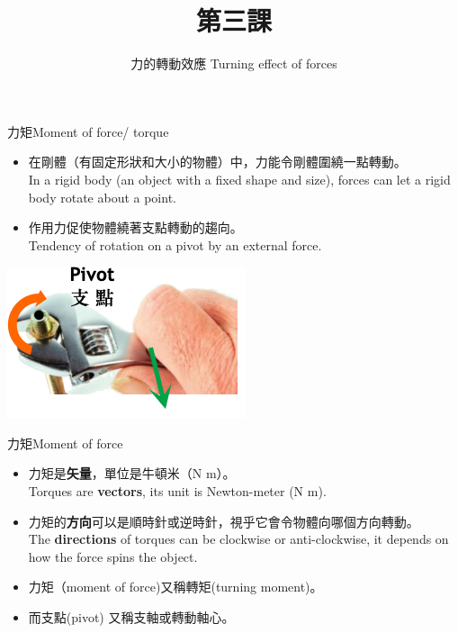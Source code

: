 \documentclass[beamer=true]{standalone}
\title{第三課}
\author{力的轉動效應 Turning effect of forces}
\institute{周末班}
\date{}
\begin{document}
\frame{\titlepage}


\begin{frame}{力矩Moment of force/ torque}
    \begin{itemize}
        \item 在剛體（有固定形狀和大小的物體）中，力能令剛體圍繞一點轉動。\\
              In a rigid body (an object with a fixed shape and size), forces can let a rigid body  rotate about a point.
        \item 作用力促使物體繞著支點轉動的趨向。\\Tendency of rotation on a pivot by an external force.
    \end{itemize}\bigskip
    {\par\centering
        \includegraphics[width=.4\textwidth]{assets/76cf8376.png}
        \par}
\end{frame}
\begin{frame}{力矩Moment of force}
    \begin{itemize}
        \item 力矩是\textbf{矢量}，單位是牛頓米（N m）。\\Torques are \textbf{vectors}, its unit is Newton-meter (N m).
        \item 力矩的\textbf{方向}可以是順時針或逆時針，視乎它會令物體向哪個方向轉動。\\The \textbf{directions} of torques can be clockwise or anti-clockwise, it depends on how the force spins the object.
        \item 力矩（moment of force)又稱轉矩(turning moment)。
        \item 而支點(pivot) 又稱支軸或轉動軸心。
    \end{itemize}

\end{frame}
\end{document}
